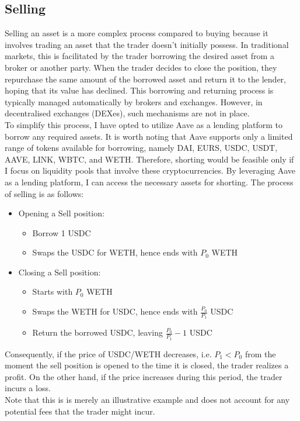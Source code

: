 \subsection{Selling}
Selling an asset is a more complex process compared to buying because it involves trading an asset that the trader doesn't initially possess. In traditional markets, this is facilitated by the trader borrowing the desired asset from a broker or another party. When the trader decides to close the position, they repurchase the same amount of the borrowed asset and return it to the lender, hoping that its value has declined. This borrowing and returning process is typically managed automatically by brokers and exchanges. However, in decentralised exchanges (DEXes), such mechanisms are not in place.
\\[5mm]
To simplify this process, I have opted to utilize Aave as a lending platform to borrow any required assets. It is worth noting that Aave supports only a limited range of tokens available for borrowing, namely DAI, EURS, USDC, USDT, AAVE, LINK, WBTC, and WETH. Therefore, shorting would be feasible only if I focus on liquidity pools that involve these cryptocurrencies. By leveraging Aave as a lending platform, I can access the necessary assets for shorting. The process of selling is as follows:
\begin{itemize}
    \item Opening a Sell position:\begin{itemize}
        \item Borrow 1 USDC
        \item Swaps the USDC for WETH, hence ends with $P_0$ WETH
    \end{itemize}
    \item Closing a Sell position:\begin{itemize}
        \item Starts with $P_0$ WETH
        \item Swaps the WETH for USDC, hence ends with $\frac{P_0}{P_1}$ USDC
        \item Return the borrowed USDC, leaving $\frac{P_0}{P_1} - 1$ USDC
    \end{itemize}
\end{itemize}
Consequently, if the price of USDC/WETH decreases, i.e. $P_1 < P_0$ from the moment the sell position is opened to the time it is closed, the trader realizes a profit. On the other hand, if the price increases during this period, the trader incurs a loss.
\\[5mm]
Note that this is is merely an illustrative example and does not account for any potential fees that the trader might incur.



